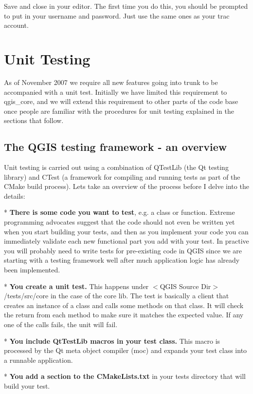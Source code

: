 Save and close in your editor. The first time you do this, you should be prompted to 
put in your username and password. Just use the same ones as your trac account.


\section{Unit Testing}
As of November 2007 we require all new features going into trunk to be accompanied with 
a unit test. Initially we have limited this requirement to qgis\_core, and we will extend 
this requirement to other parts of the code base once people are familiar with the 
procedures for unit testing explained in the sections that follow.

\subsection{The QGIS testing framework  - an overview}
Unit testing is carried out using a combination of QTestLib (the Qt testing library) and 
CTest (a framework for compiling and running tests as part of the CMake build process). 
Lets take an overview of the process before I delve into the details:

 * \textbf{There is some code you want to test}, e.g. a class or function. Extreme programming 
   advocates suggest that the code should not even be written yet when you start 
   building your tests, and then as you implement your code you can immediately validate 
   each new functional part you add with your test. In practive you will probably 
   need to write tests for pre-existing code in QGIS since we are starting with a testing 
   framework well after much application logic has already been implemented.

 * \textbf{You create a unit test.} This happens under $<$QGIS Source Dir$>$/tests/src/core 
   in the case of the core lib. The test is basically a client that creates an instance 
   of a class and calls some methods on that class. It will check the return from each 
   method to make sure it matches the expected value. If any one of the calls fails,
   the unit will fail.

 * \textbf{You include QtTestLib macros in your test class.} This macro is processed by 
   the Qt meta object compiler (moc) and expands your test class into a runnable application. 

 * \textbf{You add a section to the CMakeLists.txt} in your tests directory that will
   build your test.

